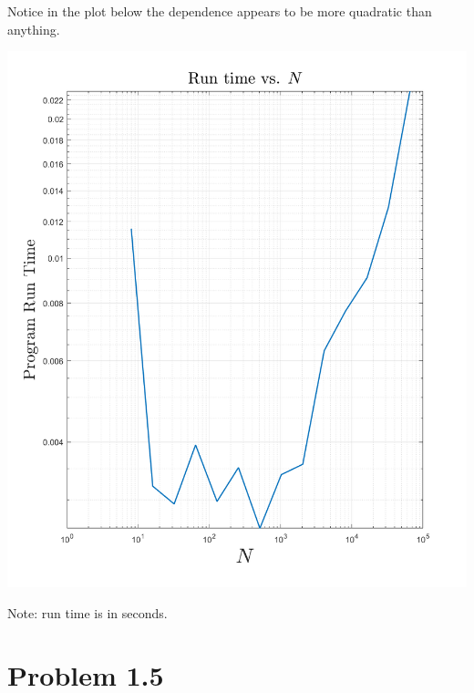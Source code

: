 \documentclass{article}
\begin{document}
Notice in the plot below the dependence appears to be more quadratic than anything. 
\newline
\begin{center}
\includegraphics[scale = 0.4]{Problem 1 plot sci comp.png}
\end{center}

Note: run time is in seconds.


\section*{Problem 1.5}
\end{document}
